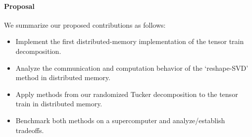 \paragraph{Proposal}
We summarize our proposed contributions as follows:
\begin{itemize}
  \item Implement the first distributed-memory implementation of the tensor train decomposition.
  \item Analyze the communication and computation behavior of the `reshape-SVD' method in distributed memory.
  \item Apply methods from our randomized Tucker decomposition to the tensor train in distributed memory.
  \item Benchmark both methods on a supercomputer and analyze/establish tradeoffs.
\end{itemize}